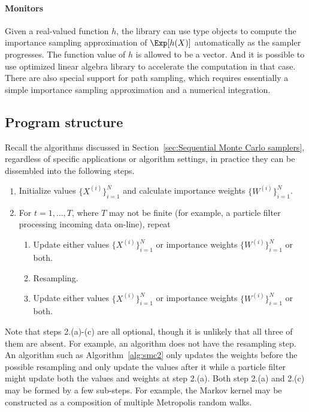 \paragraph{Monitors}

Given a real-valued function $h$, the library can use 
type objects to compute the importance sampling approximation of $\Exp[h(X)]$
automatically as the sampler progresses. The function value of $h$ is allowed
to be a vector. And it is possible to use optimized linear algebra library to
accelerate the computation in that case. There are also special support for
path sampling, which requires essentially a simple importance sampling
approximation and a numerical integration.

\subsection{Program structure}
\label{sub:Program structure}

Recall the \smc algorithms discussed in Section~\ref{sec:Sequential Monte
  Carlo samplers}, regardless of specific applications or algorithm settings,
in practice they can be dissembled into the following steps.
\begin{enumerate}
  \item Initialize values $\{X^{(i)}\}_{i=1}^N$ and calculate importance
    weights $\{W^{(i)}\}_{i=1}^N$.
  \item For $t = 1,\dots,T$, where $T$ may not be finite (for example, a
    particle filter processing incoming data on-line), repeat
    \begin{enumerate}
      \item Update either values $\{X^{(i)}\}_{i=1}^N$ or importance weights
        $\{W^{(i)}\}_{i=1}^N$ or both.
      \item Resampling.
      \item Update either values $\{X^{(i)}\}_{i=1}^N$ or importance weights
        $\{W^{(i)}\}_{i=1}^N$ or both.
    \end{enumerate}
\end{enumerate}
Note that steps 2.(a)-(c) are all optional, though it is unlikely that all
three of them are absent. For example, an \ais algorithm does not have the
resampling step. An \smc algorithm such as Algorithm~\ref{alg:smc2} only
updates the weights before the possible resampling and only update the values
after it while a particle filter might update both the values and weights at
step 2.(a). Both step 2.(a) and 2.(c) may be formed by a few sub-steps. For
example, the Markov kernel may be constructed as a composition of multiple
Metropolis random walks.

